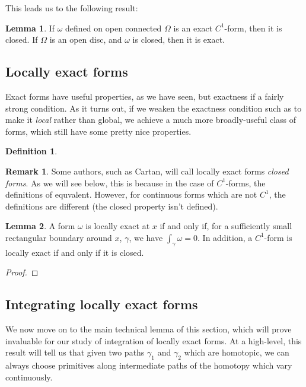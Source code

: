 \documentclass[aps,pra,showpacs,notitlepage,onecolumn,superscriptaddress,nofootinbib]{revtex4-1}
\theoremstyle{definition}
\newtheorem{definition}{Definition}[section]
\newtheorem{lemma}{Lemma}[section]
\newtheorem{remark}{Remark}[section]
\begin{document}
\noindent This leads us to the following result:
\begin{lemma}
  If $\omega$ defined on open connected $\Omega$ is an exact $C^1$-form, then it is closed. If $\Omega$ is an open disc, and $\omega$ is closed, then it is exact.
  \end{lemma}

\subsection{Locally exact forms}

\noindent Exact forms have useful properties, as we have seen, but exactness if a fairly strong condition. As it turns out, if we weaken the exactness condition such as to make it \emph{local} rather than global,
we achieve a much more broadly-useful class of forms, which still have some pretty nice properties.

\begin{definition}
\end{definition}

\begin{remark}
  Some authors, such as Cartan, will call locally exact forms \emph{closed forms}. As we will see below, this is because in the case of $C^1$-forms, the definitions of equvalent. However,
  for continuous forms which are not $C^1$, the definitions are different (the closed property isn't defined).
\end{remark}

\begin{lemma}
  A form $\omega$ is locally exact at $x$ if and only if, for a sufficiently small rectangular boundary around $x$, $\gamma$, we have $\int_{\gamma} \omega = 0$. In addition,
  a $C^1$-form is locally exact if and only if it is closed.
\end{lemma}
\begin{proof}
\end{proof}

\subsection{Integrating locally exact forms}

\noindent We now move on to the main technical lemma of this section, which will prove invaluable for our study of integration of locally exact forms.
At a high-level, this result will tell us that given two paths $\gamma_1$ and $\gamma_2$ which are homotopic, we can always choose primitives along
intermediate paths of the homotopy which vary continuously.
\end{document}
